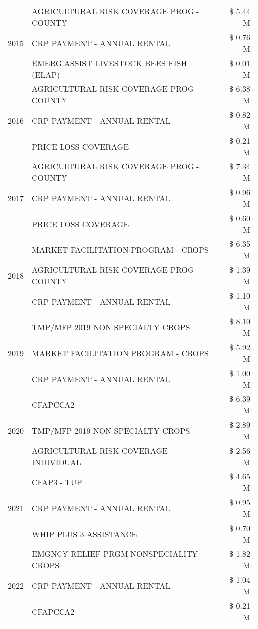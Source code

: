 \begin{tabular}{llr}
\multirow[t]{3}{*}{2015} & AGRICULTURAL RISK COVERAGE PROG - COUNTY & \$ 5.44 M \\
 & CRP PAYMENT - ANNUAL RENTAL & \$ 0.76 M \\
 & EMERG ASSIST LIVESTOCK BEES FISH (ELAP) & \$ 0.01 M \\
\cline{1-3}
\multirow[t]{3}{*}{2016} & AGRICULTURAL RISK COVERAGE PROG - COUNTY & \$ 6.38 M \\
 & CRP PAYMENT - ANNUAL RENTAL & \$ 0.82 M \\
 & PRICE LOSS COVERAGE & \$ 0.21 M \\
\cline{1-3}
\multirow[t]{3}{*}{2017} & AGRICULTURAL RISK COVERAGE PROG - COUNTY & \$ 7.34 M \\
 & CRP PAYMENT - ANNUAL RENTAL & \$ 0.96 M \\
 & PRICE LOSS COVERAGE & \$ 0.60 M \\
\cline{1-3}
\multirow[t]{3}{*}{2018} & MARKET FACILITATION PROGRAM - CROPS & \$ 6.35 M \\
 & AGRICULTURAL RISK COVERAGE PROG - COUNTY & \$ 1.39 M \\
 & CRP PAYMENT - ANNUAL RENTAL & \$ 1.10 M \\
\cline{1-3}
\multirow[t]{3}{*}{2019} & TMP/MFP 2019 NON SPECIALTY CROPS & \$ 8.10 M \\
 & MARKET FACILITATION PROGRAM - CROPS & \$ 5.92 M \\
 & CRP PAYMENT - ANNUAL RENTAL & \$ 1.00 M \\
\cline{1-3}
\multirow[t]{3}{*}{2020} & CFAPCCA2 & \$ 6.39 M \\
 & TMP/MFP 2019 NON SPECIALTY CROPS & \$ 2.89 M \\
 & AGRICULTURAL RISK COVERAGE - INDIVIDUAL & \$ 2.56 M \\
\cline{1-3}
\multirow[t]{3}{*}{2021} & CFAP3 - TUP & \$ 4.65 M \\
 & CRP PAYMENT - ANNUAL RENTAL & \$ 0.95 M \\
 & WHIP PLUS 3 ASSISTANCE & \$ 0.70 M \\
\cline{1-3}
\multirow[t]{3}{*}{2022} & EMGNCY RELIEF PRGM-NONSPECIALITY CROPS & \$ 1.82 M \\
 & CRP PAYMENT - ANNUAL RENTAL & \$ 1.04 M \\
 & CFAPCCA2 & \$ 0.21 M \\
\cline{1-3}
\bottomrule
\end{tabular}
